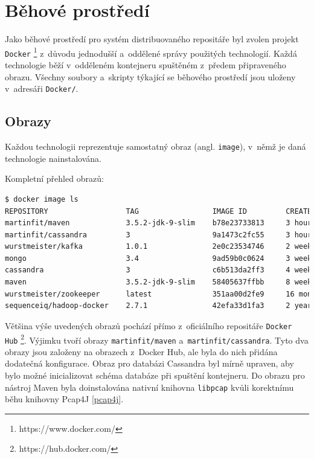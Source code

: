 \chapter{Běhové prostředí} \label{dockerEnv}
Jako běhové prostředí pro systém distribuovaného repositáře byl zvolen projekt \texttt{Docker} \footnote{https://www.docker.com/} z~důvodu jednodušší a~oddělené správy použitých technologií. Každá technologie běží v~odděleném kontejneru spuštěném z~předem připraveného obrazu. Všechny soubory a~skripty týkající se běhového prostředí jsou uloženy v~adresáři \texttt{Docker/}.

\section{Obrazy}
Každou technologii reprezentuje samostatný obraz (angl. \texttt{image}), v~němž je daná technologie nainstalována.

\vspace{0.5cm}
\noindent Kompletní přehled obrazů:

\begin{lstlisting}[language=bash,basicstyle={\small\ttfamily}]
$ docker image ls
REPOSITORY                  TAG                 IMAGE ID         CREATED          SIZE
martinfit/maven             3.5.2-jdk-9-slim    b78e23733813     3 hours ago      449MB
martinfit/cassandra         3                   9a1473c2fc55     3 hours ago      323MB
wurstmeister/kafka          1.0.1               2e0c23534746     2 weeks ago      330MB
mongo                       3.4                 9ad59b0c0624     3 weeks ago      360MB
cassandra                   3                   c6b513da2ff3     4 weeks ago      323MB
maven                       3.5.2-jdk-9-slim    58405637ffbb     8 weeks ago      392MB
wurstmeister/zookeeper      latest              351aa00d2fe9     16 months ago    478MB
sequenceiq/hadoop-docker    2.7.1               42efa33d1fa3     2 years ago      1.76GB
\end{lstlisting}

\noindent Většina výše uvedených obrazů pochází přímo z~oficiálního repositáře \texttt{Docker Hub} \footnote{https://hub.docker.com/}. Výjimku tvoří obrazy \texttt{martinfit/maven} a~\texttt{martinfit/cassandra}. Tyto dva obrazy jsou založeny na obrazech z~Docker Hub, ale byla do nich přidána dodatečná konfigurace. Obraz pro databázi Cassandra byl mírně upraven, aby bylo možné inicializovat schéma databáze při spuštění kontejneru. Do obrazu pro nástroj Maven byla doinstalována nativní knihovna \texttt{libpcap} kvůli korektnímu běhu knihovny Pcap4J \ref{pcap4j}.

